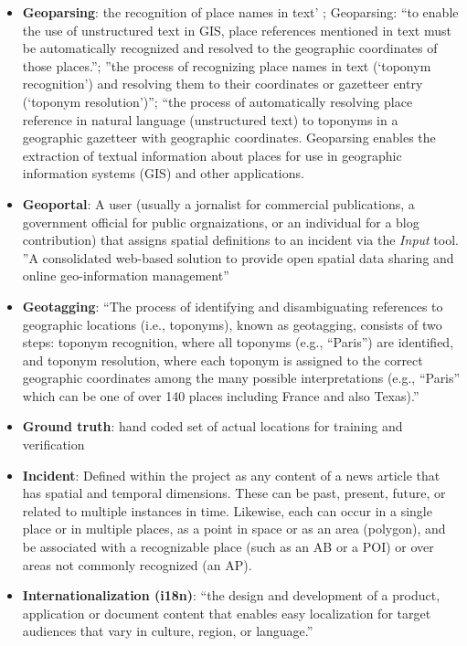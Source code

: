 \begin{itemize}
	\item[] \textbf{Geoparsing}: {\color{orange} the recognition of place names in text' \cite{Silva2006}}; {Geoparsing: “to enable the use of unstructured text in GIS, place references mentioned in text must be automatically recognized and resolved to the geographic coordinates of those places.”\cite{Karimzadeh2019a}}; {\color{orange}''the process of recognizing place names in text (‘toponym recognition’) and resolving them to their coordinates or gazetteer entry (‘toponym resolution’)''\cite{Halterman2019}}; {\color{orange}“the process of automatically resolving place reference in natural language (unstructured text) to toponyms in a geographic gazetteer with geographic coordinates. Geoparsing enables the extraction of textual information about places for use in geographic information systems (GIS) and other applications.\cite{Karimzadeh2019}}
	\item[] \textbf{Geoportal}: {\color{red} A user (usually a jornalist for commercial publications, a government official for public orgnaizations, or an individual for a blog contribution) that assigns spatial definitions to an incident via the \textit{Input} tool}. {\color{orange}''A consolidated web-based solution to provide open spatial data sharing and online geo-information management''\cite{Jiang2020}}\\
	\item[] \textbf{Geotagging}: {``The process of identifying and disambiguating references to geographic locations (i.e., toponyms), known as geotagging, consists of two steps: toponym recognition, where all toponyms (e.g., “Paris”) are identified, and toponym resolution, where each toponym is assigned to the correct geographic coordinates among the many possible interpretations (e.g., “Paris” which can be one of over 140 places including France and also Texas).'' \cite{Lieberman2010}}
	\item[] \textbf{Ground truth}: {hand coded set of actual locations for training and verification\cite{Lee2019}}
	\item[] \textbf{Incident}: Defined within the project as any content of a news article that has spatial and temporal dimensions.  These can be past, present, future, or related to multiple instances in time. Likewise, each can occur in a single place or in multiple places, as a point in space or as an area (polygon), and be associated with a recognizable place (such as an AB or a POI) or over areas not commonly recognized (an AP).
	\item[] \textbf{Internationalization (i18n)}: {``the design and development of a product, application or document content that enables easy localization for target audiences that vary in culture, region, or language.'' \cite{Ishida2005}}

\end{itemize}
